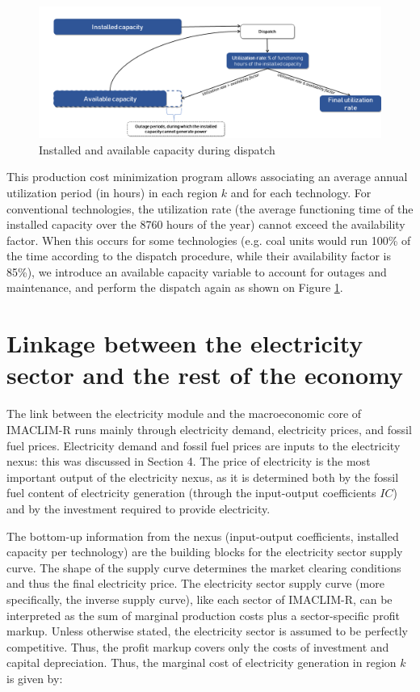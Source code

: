 \begin{figure}[H]
    \centerline{\includegraphics[scale=0.6]{figures&tables/availb.png}}
    \caption{Installed and available capacity during dispatch}
    \label{fig:avail}
\end{figure}


This production cost minimization program allows associating an average annual utilization period (in hours) in each region $k$ and for each technology. For conventional technologies, the utilization rate (the average functioning time of the installed capacity over the 8760 hours of the year) cannot exceed the availability factor. When this occurs for some technologies (e.g. coal units would run 100\% of the time according to the dispatch procedure, while their availability factor is 85\%), we introduce an available capacity variable to account for outages and maintenance, and perform the dispatch again as shown on Figure \ref{fig:avail}.


\section{Linkage between the electricity sector and the rest of the economy}

The link between the electricity module and the macroeconomic core of IMACLIM-R runs mainly through electricity demand, electricity prices, and fossil fuel prices. Electricity demand and fossil fuel prices are inputs to the electricity nexus: this was discussed in Section 4. The price of electricity is the most important output of the electricity nexus, as it is determined both by the fossil fuel content of electricity generation (through the input-output coefficients $IC$) and by the investment required to provide electricity. 

The bottom-up information from the nexus (input-output coefficients, installed capacity per technology) are the building blocks for the electricity sector supply curve. The shape of the supply curve determines the market clearing conditions and thus the final electricity price. The electricity sector supply curve (more specifically, the inverse supply curve), like each sector of IMACLIM-R, can be interpreted as the sum of marginal production costs plus a sector-specific profit markup. Unless otherwise stated, the electricity sector is assumed to be perfectly competitive. Thus, the profit markup covers only the costs of investment and capital depreciation.
Thus, the marginal cost of electricity generation in region $k$ is given by:

